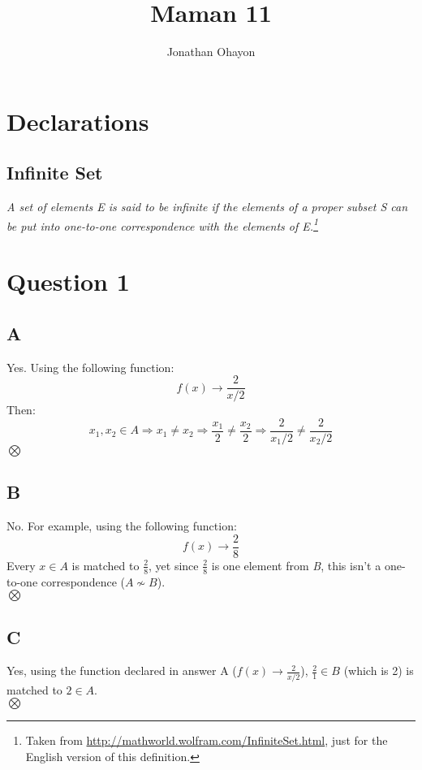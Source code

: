 \documentclass[12pt, oneside]{article}
\title{Maman 11}
\author{Jonathan Ohayon}
\begin{document}
\maketitle
\setcounter{section}{-1}

\section{Declarations}
\subsection{Infinite Set}
\begin{center}
\emph{A set of elements E is said to be infinite if the elements of a proper subset S can be put into one-to-one correspondence with the elements of E.\footnote{Taken from \url{http://mathworld.wolfram.com/InfiniteSet.html}, just for the English version of this definition.}}
\end{center}

\section{Question 1}
\subsection{A}
Yes. Using the following function:
\begin{equation*}
f(x) \rightarrow \frac{2}{x/2}
\end{equation*}
Then:
\begin{equation*}
x_1, x_2 \in A \Rightarrow
x_1 \neq x_2 \Rightarrow
\frac{x_1}{2} \neq \frac{x_2}{2} \Rightarrow
\frac{2}{x_1/2} \neq \frac{2}{x_2/2}
\end{equation*}
$\bigotimes$
\clearpage

\subsection{B}
No. For example, using the following function:
\begin{equation*}
f(x) \rightarrow \frac{2}{8}
\end{equation*}
Every $x \in A$ is matched to $\frac{2}{8}$, yet since $\frac{2}{8}$ is one element from \emph{B}, this isn't a one-to-one correspondence ($A \nsim B$).\\
$\bigotimes$

\subsection{C}
Yes, using the function declared in answer A ($f(x) \rightarrow \frac{2}{x/2}$), $\frac{2}{1} \in B$ (which is 2) is matched to $2 \in A$.\\
$\bigotimes$
\end{document}
